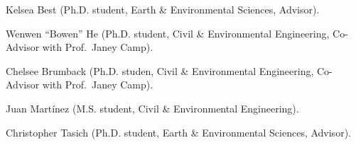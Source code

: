 \item Kelsea Best (Ph.D. student, Earth \& Environmental Sciences, Advisor).
\item Wenwen ``Bowen'' He (Ph.D. student, Civil \& Environmental Engineering, Co-Advisor with Prof.\ Janey Camp).
\item Chelsee Brumback (Ph.D. studen, Civil \& Environmental Engineering,
Co-Advisor with Prof.\ Janey Camp).
\item Juan Mart\'inez (M.S. student, Civil \& Environmental Engineering).
\item Christopher Tasich (Ph.D. student, Earth \& Environmental Sciences, Advisor).
